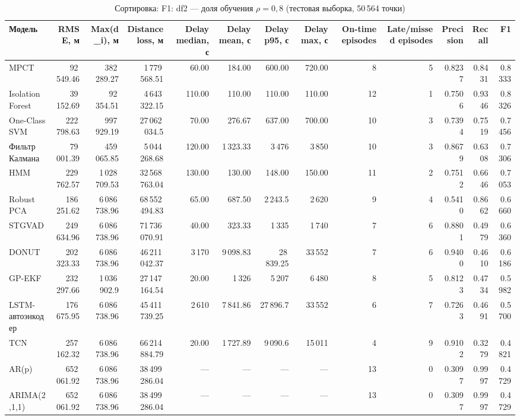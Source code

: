 \documentclass[a4paper,12pt]{report}
\begin{document}
\begin{table}[H]
\centering
\scriptsize
\setlength{\tabcolsep}{3pt}
\caption{Сортировка: F1: df2 — доля обучения $\rho=0{,}8$ (тестовая выборка, 50\,564 точки)}
\begin{tabular}{lrrrrrrrrrrrr}
\toprule
Модель & RMSE, м & Max(d\_i), м & Distance loss, м & Delay median, с & Delay mean, с & Delay p95, с & Delay max, с & On-time episodes & Late/missed episodes & Precision & Recall & F1 \\
\midrule
MPCT & 92\,549.46 & 382\,289.27 & 1\,779\,568.51 & 60.00 & 184.00 & 600.00 & 720.00 & 8 & 5 & 0.8237 & 0.8431 & 0.8333 \\
Isolation Forest & 39\,152.69 & 92\,354.51 & 4\,643\,322.15 & 110.00 & 110.00 & 110.00 & 110.00 & 12 & 1 & 0.7506 & 0.9346 & 0.8326 \\
One-Class SVM & 222\,798.63 & 997\,929.19 & 27\,062\,034.5 & 70.00 & 276.67 & 637.00 & 700.00 & 10 & 3 & 0.7394 & 0.7519 & 0.7456 \\
Фильтр Калмана & 79\,001.39 & 459\,065.85 & 5\,044\,268.68 & 120.00 & 1\,323.33 & 3\,476 & 3\,850 & 10 & 3 & 0.8679 & 0.6308 & 0.7306 \\
HMM & 229\,762.57 & 1\,028\,709.53 & 32\,568\,763.04 & 130.00 & 130.00 & 148.00 & 150.00 & 11 & 2 & 0.7512 & 0.6646 & 0.7053 \\
Robust PCA & 186\,251.62 & 6\,086\,738.96 & 68\,552\,494.83 & 65.00 & 687.50 & 2\,243.5 & 2\,620 & 9 & 4 & 0.5410 & 0.8662 & 0.6660 \\
STGVAD & 249\,634.96 & 6\,086\,738.96 & 71\,736\,070.91 & 40.00 & 323.33 & 1\,335 & 1\,740 & 7 & 6 & 0.8801 & 0.4979 & 0.6360 \\
DONUT & 202\,323.33 & 6\,086\,738.96 & 46\,211\,042.37 & 3\,170 & 9\,098.83 & 28\,839.25 & 33\,552 & 7 & 6 & 0.9400 & 0.4610 & 0.6186 \\
GP-EKF & 232\,297.66 & 1\,036\,902.9 & 27\,147\,164.54 & 20.00 & 1\,326 & 5\,207 & 6\,480 & 8 & 5 & 0.8123 & 0.4734 & 0.5982 \\
LSTM-автоэнкодер & 176\,675.95 & 6\,086\,738.96 & 45\,411\,739.25 & 2\,610 & 7\,841.86 & 27\,896.7 & 33\,552 & 6 & 7 & 0.7263 & 0.4691 & 0.5700 \\
TCN & 257\,162.32 & 6\,086\,738.96 & 66\,214\,884.79 & 20.00 & 1\,727.89 & 9\,090.6 & 15\,011 & 4 & 9 & 0.9102 & 0.3279 & 0.4821 \\
AR(p) & 652\,061.92 & 6\,086\,738.96 & 38\,499\,286.04 & --- & --- & --- & --- & 13 & 0 & 0.3097 & 0.9997 & 0.4729 \\
ARIMA(2,1,1) & 652\,061.92 & 6\,086\,738.96 & 38\,499\,286.04 & --- & --- & --- & --- & 13 & 0 & 0.3097 & 0.9997 & 0.4729 \\

\end{tabular}
\end{table}
\end{document}
